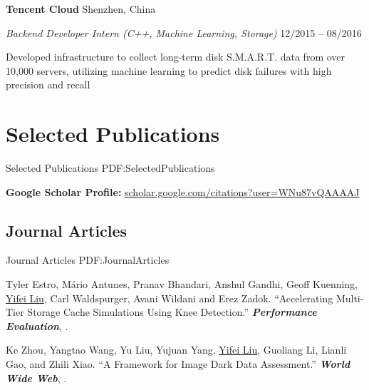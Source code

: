 \documentclass[a4paper,10pt,oneside]{article}
\begin{document}
\begin{body}
\GapNoBreak
{\textbf{Tencent Cloud}} 
\hfill
Shenzhen, China

\emph{Backend Developer Intern (C++, Machine Learning, Storage)}
\hfill
12/2015 --
08/2016

\GapNoBreak
\BulletItem
Developed infrastructure to collect long-term disk S.M.A.R.T. data from over 10,000 servers, utilizing machine learning to predict disk failures with high precision and recall 



\section
{Selected Publications}
{Selected Publications}
{PDF:SelectedPublications}


\textbf{Google Scholar Profile:} \href{https://scholar.google.com/citations?user=WNu87vQAAAAJ}{scholar.google.com/citations?user=WNu87vQAAAAJ}

\subsection
{Journal Articles}
{Journal Articles}
{PDF:JournalArticles}

\NumberedItem{[1]}
Tyler Estro, Mário Antunes, Pranav Bhandari, Anshul Gandhi, Geoff Kuenning, \underline{Yifei Liu}, Carl Waldspurger, Avani Wildani and Erez Zadok.
``Accelerating Multi-Tier Storage Cache Simulations Using Knee Detection.'' 
\textit{\textbf{Performance Evaluation}},
.


\NumberedItem{[2]}
Ke Zhou, Yangtao Wang, Yu Liu, Yujuan Yang, \underline{Yifei Liu}, Guoliang Li, Lianli Gao, and Zhili Xiao.
``A Framework for Image Dark Data Assessment.'' 
\textit{\textbf{World Wide Web}},
.



\end{body}
\end{document}
